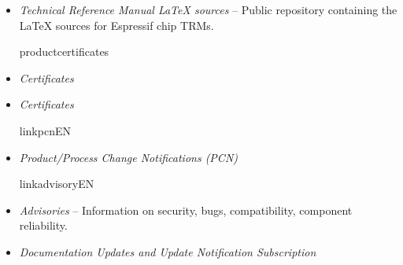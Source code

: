 {\begin{minipage}{\textwidth}
\begin{itemize}
  \ifcsname linktrmlatexsourcerepo\endcsname%
    \item \textit{Technical Reference Manual LaTeX sources} --
        {\small Public repository containing the LaTeX sources for Espressif chip TRMs.}\\
        \href{\linkprefix\linktrmlatexsourcerepo}{\linkprefix\linktrmlatexsourcerepo}
  \fi%

  \ifcsname productcertificates\endcsname%
    \item \textit{Certificates}\\
        \href{\linkprefix\linkcertificatesEN\productcertificates}{\linkprefix\linkcertificatesEN}
  \else
    \item \textit{Certificates}\\
        \href{\linkprefix\linkcertificatesEN}{\linkprefix\linkcertificatesEN}
  \fi%

  \ifcsname linkpcnEN\endcsname%
    \item \textit{\chipseries{} Product/Process Change Notifications (PCN)}\\
        \href{\linkprefix\linkpcnEN}{\linkprefix\linkpcnEN}
  \fi%

  \ifcsname linkadvisoryEN\endcsname%
    \item \textit{\chipseries{} Advisories} --
        {\small Information on security, bugs, compatibility, component reliability.}\\
        \href{\linkprefix\linkadvisoryEN}{\linkprefix\linkadvisoryEN}
  \fi%

    \item \textit{Documentation Updates and Update Notification Subscription}\\
        \href{\linkprefix\linkrecentlyupdatedEN}{\linkprefix\linkrecentlyupdatedEN}

\end{itemize}

\end{minipage}



\begin{minipage}{\textwidth}


\end{minipage}}
